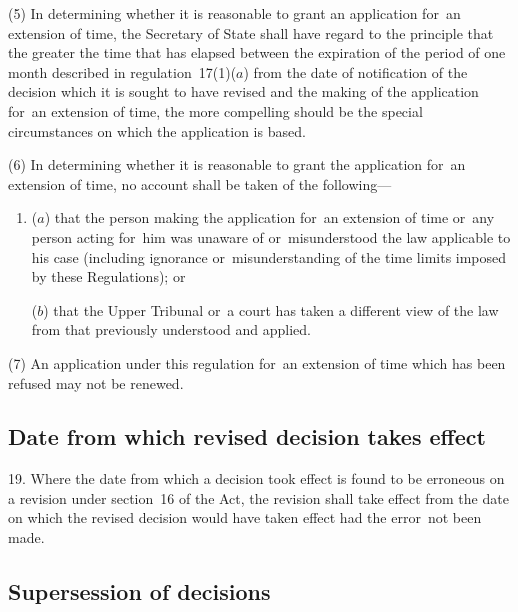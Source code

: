 \documentclass[a4paper,12pt]{article}
\begin{document}
(5) In determining whether it is reasonable to grant an application for~an extension of time, the Secretary of State shall have regard to the principle that the greater the time that has elapsed between the expiration of the period of one month described in regulation~17(1)($a$) from the date of notification of the decision which it is sought to have revised and the making of the application for~an extension of time, the more compelling should be the special circumstances on which the application is based.

(6) In determining whether it is reasonable to grant the application for~an extension of time, no account shall be taken of the following---
\begin{enumerate}\item[]
($a$) that the person making the application for~an extension of time or~any person acting for~him was unaware of or~misunderstood the law applicable to his case (including ignorance or~misunderstanding of the time limits imposed by these Regulations); or

($b$) that 
the Upper Tribunal  %
or~a court has taken a different view of the law from that previously understood and applied.
\end{enumerate}

(7) An application under this regulation for~an extension of time which has been refused may not be renewed.


\subsection[19. Date from which revised decision takes effect]{Date from which revised decision takes effect}

19.  Where the date from which a decision took effect is found to be erroneous on a revision under section~16 of the Act, the revision shall take effect from the date on which the revised decision would have taken effect had the error~not been made.

\subsection[20. Supersession of decisions]{Supersession of decisions}
\end{document}
